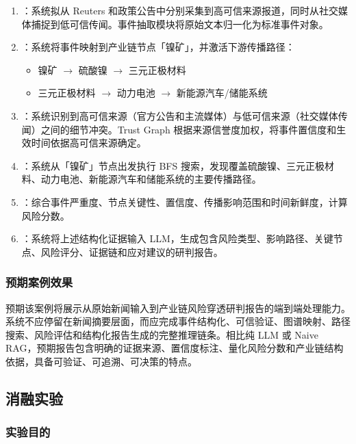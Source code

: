 \begin{enumerate}
    \item {}：系统拟从 Reuters 和政策公告中分别采集到高可信来源报道，同时从社交媒体捕捉到低可信传闻。事件抽取模块将原始文本归一化为标准事件对象。
    \item {}：系统将事件映射到产业链节点「镍矿」，并激活下游传播路径：
    \begin{itemize}
        \item 镍矿 $\to$ 硫酸镍 $\to$ 三元正极材料
        \item 三元正极材料 $\to$ 动力电池 $\to$ 新能源汽车/储能系统
    \end{itemize}
    \item {}：系统识别到高可信来源（官方公告和主流媒体）与低可信来源（社交媒体传闻）之间的细节冲突。Trust Graph 根据来源信誉度加权，将事件置信度和生效时间依据高可信来源确定。
    \item {}：系统从「镍矿」节点出发执行 BFS 搜索，发现覆盖硫酸镍、三元正极材料、动力电池、新能源汽车和储能系统的主要传播路径。
    \item {}：综合事件严重度、节点关键性、置信度、传播影响范围和时间新鲜度，计算风险分数。
    \item {}：系统将上述结构化证据输入 LLM，生成包含风险类型、影响路径、关键节点、风险评分、证据链和应对建议的研判报告。
\end{enumerate}

\subsubsection{预期案例效果}

预期该案例将展示\projectshort 从原始新闻输入到产业链风险穿透研判报告的端到端处理能力。系统不应停留在新闻摘要层面，而应完成事件结构化、可信验证、图谱映射、路径搜索、风险评估和结构化报告生成的完整推理链条。相比纯 LLM 或 Naive RAG，预期报告包含明确的证据来源、置信度标注、量化风险分数和产业链结构依据，具备可验证、可追溯、可决策的特点。

\subsection{消融实验}
\label{sec:exp-ablation}

\subsubsection{实验目的}

